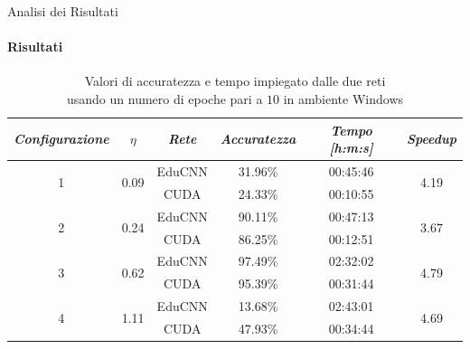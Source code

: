 \documentclass[
 ]{beamer}
\begin{document}
\begin{frame}{Analisi dei Risultati}
    \framesubtitle{Risultati}

        \begin{table}
            \centering
            \renewcommand\arraystretch{1.3}
            \small
            \begin{tabular}{| c | c | c | c | c | c |}
                \hline
                \emph{Configurazione} & $\eta$ & \emph{Rete} & \emph{Accuratezza} & \emph{Tempo [h:m:s]} & \emph{Speedup} \\
                \hline
                \multirow{2}{*}{1} & \multirow{2}{*}{0.09} & EduCNN & 31.96\% & 00:45:46 & \multirow{2}{*}{4.19} \\ \cline{3-5} 
                                   &                       & CUDA   & 24.33\% & 00:10:55 & \\
                \hline
                \multirow{2}{*}{2} & \multirow{2}{*}{0.24} & EduCNN & 90.11\% & 00:47:13 & \multirow{2}{*}{3.67} \\ \cline{3-5} 
                                   &                       & CUDA   & 86.25\% & 00:12:51 & \\
                \hline
                \multirow{2}{*}{3} & \multirow{2}{*}{0.62} & EduCNN & 97.49\% & 02:32:02 & \multirow{2}{*}{4.79} \\ \cline{3-5} 
                                   &                       & CUDA   & 95.39\% & 00:31:44 & \\
                \hline
                \multirow{2}{*}{4} & \multirow{2}{*}{1.11} & EduCNN & 13.68\% & 02:43:01 & \multirow{2}{*}{4.69} \\ \cline{3-5} 
                                   &                       & CUDA   & 47.93\% & 00:34:44 & \\
                \hline
            \end{tabular}
            \caption            
    {Valori di accuratezza e tempo impiegato dalle due reti \\ usando un numero di epoche pari a $10$ in ambiente Windows\endtabular}          
        \end{table}    
\end{frame}
\end{document}
